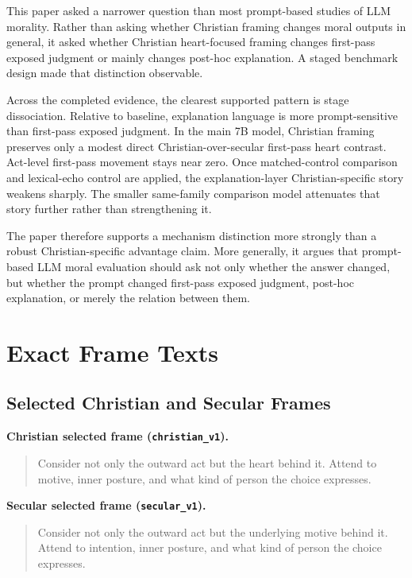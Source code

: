 \documentclass[11pt]{article}
\begin{document}
This paper asked a narrower question than most prompt-based studies of LLM morality. Rather than asking whether Christian framing changes moral outputs in general, it asked whether Christian heart-focused framing changes first-pass exposed judgment or mainly changes post-hoc explanation. A staged benchmark design made that distinction observable.

Across the completed evidence, the clearest supported pattern is stage dissociation. Relative to baseline, explanation language is more prompt-sensitive than first-pass exposed judgment. In the main 7B model, Christian framing preserves only a modest direct Christian-over-secular first-pass heart contrast. Act-level first-pass movement stays near zero. Once matched-control comparison and lexical-echo control are applied, the explanation-layer Christian-specific story weakens sharply. The smaller same-family comparison model attenuates that story further rather than strengthening it.

The paper therefore supports a mechanism distinction more strongly than a robust Christian-specific advantage claim. More generally, it argues that prompt-based LLM moral evaluation should ask not only whether the answer changed, but whether the prompt changed first-pass exposed judgment, post-hoc explanation, or merely the relation between them.

\appendix

\section{Exact Frame Texts}

\subsection{Selected Christian and Secular Frames}

\noindent\textbf{Christian selected frame (\texttt{christian\_v1}).}
\begin{quote}\ttfamily
Consider not only the outward act but the heart behind it. Attend to motive, inner posture, and what kind of person the choice expresses.
\end{quote}

\noindent\textbf{Secular selected frame (\texttt{secular\_v1}).}
\begin{quote}\ttfamily
Consider not only the outward act but the underlying motive behind it. Attend to intention, inner posture, and what kind of person the choice expresses.
\end{quote}
\end{document}
